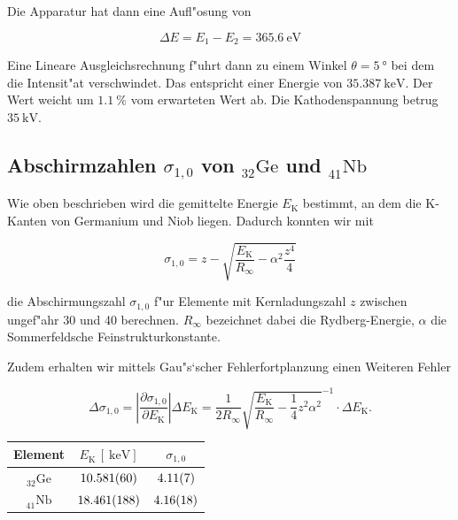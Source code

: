 		Die Apparatur hat dann eine Aufl"osung von

		\begin{equation}
			\Delta E = E_1 - E_2 = \SI{365.6}{\electronvolt} \nonumber
		\end{equation}

		Eine Lineare Ausgleichsrechnung f"uhrt dann zu einem Winkel $\theta = \SI{5}{\degree}$ bei dem die Intensit"at verschwindet.
		Das entspricht einer Energie von $\SI{35.387}{\kilo \electronvolt}$. Der Wert weicht um $\SI{1.1}{\percent}$ vom erwarteten Wert ab. Die Kathodenspannung betrug $\SI{35}{\kilo \volt}$.

	\subsection{Abschirmzahlen $\sigma_{1,0}$ von ${}_{32}^{}\mathrm{Ge}$ und ${}_{41}^{}\mathrm{Nb}$}
		\label{subsec:abschirm1}
		Wie oben beschrieben wird die gemittelte Energie $E_\mathrm{K}$ bestimmt, an dem die K-Kanten von Germanium und Niob liegen. 
		Dadurch konnten wir mit 

		\begin{equation}
			\sigma_{1,0} = z - \sqrt{\frac{E_\mathrm{K}}{R_\infty} - \alpha^2 \frac{z^4}{4}} \nonumber
		\end{equation}

		die Abschirmungszahl $\sigma_{1,0}$ f"ur Elemente mit Kernladungszahl $z$ zwischen ungef"ahr 30 und 40 berechnen.
		$R_\infty$ bezeichnet dabei die Rydberg-Energie, $\alpha$ die Sommerfeldsche Feinstrukturkonstante.

		Zudem erhalten wir mittels Gau"s`scher Fehlerfortplanzung einen Weiteren Fehler

		\begin{equation}
			\Delta \sigma_{1,0} = \left| \frac{\partial \sigma_{1,0}}{\partial E_\mathrm{K}} \right| \Delta E_\mathrm{K} =
			\frac{1}{2 R_{\infty}} \sqrt{\frac{E_\mathrm{K}}{R_\infty} - \frac{1}{4} z^2 \alpha^2}^{-1}
			\cdot \Delta E_\mathrm{K} . \nonumber
		\end{equation}

		\begin{table}[h!]
			\centering
			\begin{tabular}{|c|c|c|}
				\hline
				Element & 
				$E_\mathrm{K}\,[\SI{}{\kilo \electronvolt}]$ & 
				$\sigma_{1,0}$ \\
				\hline \hline
				${}_{32}^{}\mathrm{Ge}$ & $\SI{10.581 (60)}{}$ & $\SI{4.11 (7)}{}$ \\
				${}_{41}^{}\mathrm{Nb}$ & $\SI{18.461 (188)}{}$ & $\SI{4.16 (18)}{}$ \\
				\hline
			\end{tabular}
		\end{table}


